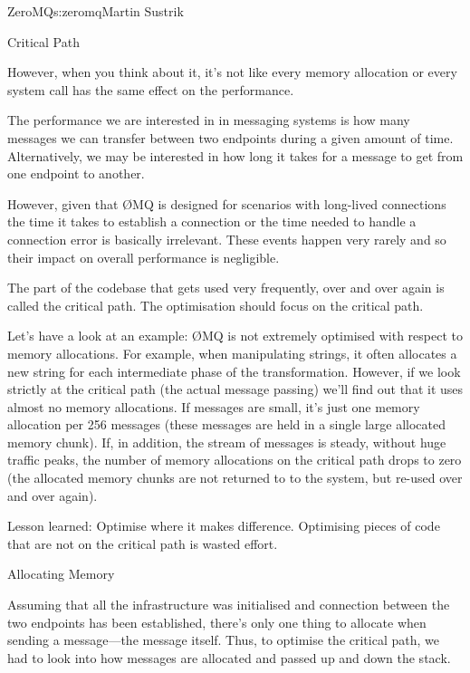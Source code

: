 \begin{aosachapter}{ZeroMQ}{s:zeromq}{Martin Sustrik}
\begin{aosasect1}{Critical Path}
\begin{aosaitemize}
\end{aosaitemize}

However, when you think about it, it's not like every memory
allocation or every system call has the same effect on the
performance.

The performance we are interested in in messaging systems is how many
messages we can transfer between two endpoints during a given amount
of time. Alternatively, we may be interested in how long it takes for
a message to get from one endpoint to another.

However, given that ØMQ is designed for scenarios with long-lived
connections the time it takes to establish a connection or the time
needed to handle a connection error is basically irrelevant. These
events happen very rarely and so their impact on overall performance
is negligible.

The part of the codebase that gets used very frequently, over and over
again is called the critical path. The optimisation should focus on
the critical path.

Let's have a look at an example: ØMQ is not extremely optimised with
respect to memory allocations. For example, when manipulating strings,
it often allocates a new string for each intermediate phase of the
transformation. However, if we look strictly at the critical path (the
actual message passing) we'll find out that it uses almost no memory
allocations. If messages are small, it's just one memory allocation
per 256 messages (these messages are held in a single large allocated
memory chunk). If, in addition, the stream of messages is steady,
without huge traffic peaks, the number of memory allocations on the
critical path drops to zero (the allocated memory chunks are not
returned to to the system, but re-used over and over again).

Lesson learned: Optimise where it makes difference. Optimising pieces
of code that are not on the critical path is wasted effort.

\end{aosasect1}

\begin{aosasect1}{Allocating Memory}

Assuming that all the infrastructure was initialised and connection
between the two endpoints has been established, there's only one thing
to allocate when sending a message---the message itself. Thus, to
optimise the critical path, we had to look into how messages are
allocated and passed up and down the stack.


\end{aosasect1}
\end{aosachapter}

